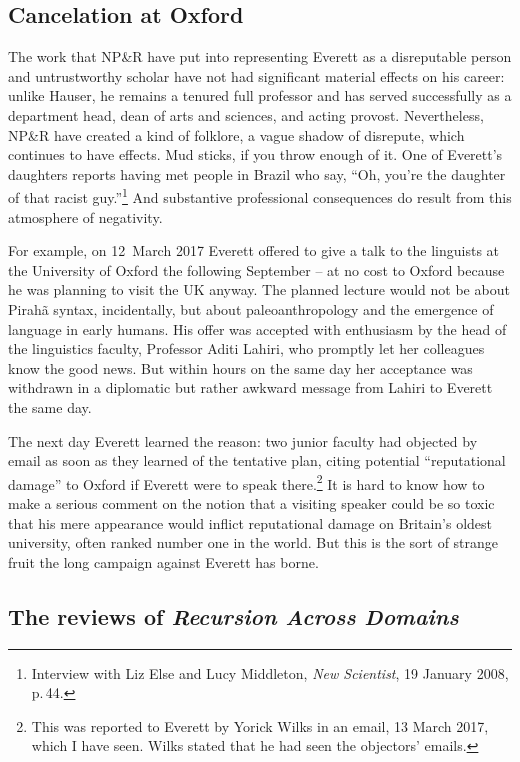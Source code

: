 \documentclass[output=paper,colorlinks,citecolor=brown
]{langscibook}
\begin{document}
\subsection{Cancelation at Oxford}
\label{sec-Oxford-cancelation}

The work that NP\&R have put into representing Everett as a disreputable
person and untrustworthy scholar have not had significant material effects
on his career: unlike Hauser, he remains a tenured full professor and has
served successfully as a department head, dean of arts and sciences, and
acting provost. Nevertheless, NP\&R have created a kind of folklore, a
vague shadow of disrepute, which continues to have effects. Mud sticks,
if you throw enough of it. One of Everett's daughters reports having met
people in Brazil who say, ``Oh, you're the daughter of that racist
guy.''\footnote{%
   Interview with Liz Else and Lucy Middleton, \textit{New Scientist},
   19 January 2008, p.\,44.}
And substantive professional consequences do result from this atmosphere
of negativity.

For example, on 12~March 2017 Everett offered to give a talk to the
linguists at the University of Oxford the following September -- at
no cost to Oxford because he was planning to visit the UK anyway. The
planned lecture would not be about Pirah{\~a} syntax, incidentally,
but about paleoanthropology and the emergence of language in early
humans. His offer was accepted with enthusiasm by the head of the
linguistics faculty, Professor Aditi Lahiri, who promptly let her
colleagues know the good news. But within hours on the same day her
acceptance was withdrawn in a diplomatic but rather awkward message
from Lahiri to Everett the same day.

The next day Everett learned the reason: two junior faculty had
objected by email as soon as they learned of the tentative plan,
citing potential ``reputational damage'' to Oxford if Everett were to
speak there.\footnote{%
   This was reported to Everett by Yorick Wilks in an email,
   13 March 2017, which I have seen. Wilks stated that he had seen
   the objectors' emails.}
It is hard to know how to make a serious comment on the notion that
a visiting speaker could be so toxic that his mere appearance would
inflict reputational damage on Britain's oldest university, often
ranked number one in the world. But this is the sort of strange fruit
the long campaign against Everett has borne.

\subsection{The reviews of \textit{Recursion Across Domains}}
\end{document}
